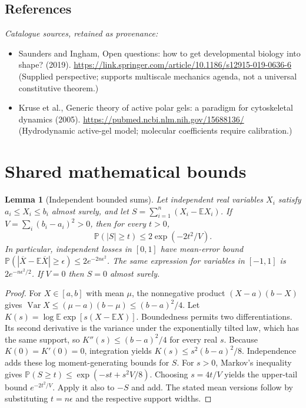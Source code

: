 \documentclass[11pt]{article}
\newcommand{\E}{\mathbb E}
\newcommand{\Prob}{\mathbb P}
\DeclareMathOperator{\Var}{Var}
\providecommand{\E}{\mathbb E}
\providecommand{\Prob}{\mathbb P}
\providecommand{\Var}{\operatorname{Var}}
\newtheorem{sharedlemma}{Lemma}[section]
\begin{document}
\subsection{References}
\noindent\emph{Catalogue sources, retained as provenance:}
\begin{itemize}
\item Saunders and Ingham, Open questions: how to get developmental biology into shape? (2019). \url{https://link.springer.com/article/10.1186/s12915-019-0636-6} (Supplied perspective; supports multiscale mechanics agenda, not a universal constitutive theorem.)
\item Kruse et al., Generic theory of active polar gels: a paradigm for cytoskeletal dynamics (2005). \url{https://pubmed.ncbi.nlm.nih.gov/15688136/} (Hydrodynamic active-gel model; molecular coefficients require calibration.)
\end{itemize}
\clearpage


\appendix
\section{Shared mathematical bounds}\label{app:bounds}
\begin{sharedlemma}[Independent bounded sums]\label{lem:bounded}
Let independent real variables $X_i$ satisfy $a_i\leq X_i\leq b_i$ almost surely,
and let $S=\sum_{i=1}^n(X_i-\E X_i)$. If
$V=\sum_i(b_i-a_i)^2>0$, then for every $t>0$,
\[
 \Prob(|S|\geq t)\leq 2\exp(-2t^2/V).
\]
In particular, independent losses in $[0,1]$ have mean-error bound
$\Prob(|\overline X-\E\overline X|\geq\epsilon)
\leq2e^{-2n\epsilon^2}$. The same expression for variables in $[-1,1]$
is $2e^{-n\epsilon^2/2}$. If $V=0$ then $S=0$ almost surely.
\end{sharedlemma}
\begin{proof}
For $X\in[a,b]$ with mean $\mu$, the nonnegative product
$(X-a)(b-X)$ gives
$\Var X\leq(\mu-a)(b-\mu)\leq(b-a)^2/4$.
Let $K(s)=\log\E\exp[s(X-\E X)]$.
Boundedness permits two differentiations. Its second derivative is the variance
under the exponentially tilted law, which has the same support, so
$K''(s)\leq(b-a)^2/4$ for every real $s$.
Because $K(0)=K'(0)=0$, integration yields
$K(s)\leq s^2(b-a)^2/8$.
Independence adds these log moment-generating bounds for $S$.
For $s>0$, Markov's inequality gives
$\Prob(S\geq t)\leq\exp(-st+s^2V/8)$.
Choosing $s=4t/V$ yields the upper-tail bound $e^{-2t^2/V}$.
Apply it also to $-S$ and add. The stated mean versions follow by substituting
$t=n\epsilon$ and the respective support widths.
\end{proof}
\end{document}
